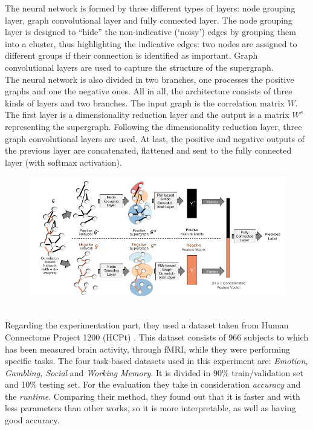The neural network is formed by three different types of layers: node grouping layer, graph convolutional layer and fully connected layer. The node grouping layer is designed to “hide” the non-indicative (‘noisy’) edges by grouping them into a cluster, thus highlighting the indicative edges: two nodes are assigned to different groups if their connection is identified as important.
Graph convolutional layers are used to capture the structure of the supergraph.
\\

The neural network is also divided in two branches, one processes the positive graphs and one the negative ones. 
All in all, the architecture consists of three kinds of layers and two branches. 
The input graph is the correlation matrix $W$. The first layer is a dimensionality reduction layer and the output is a matrix $W^{s}$ representing the supergraph. Following the dimensionality reduction layer, three graph convolutional layers are used. At last, the positive and negative outputs of the previous layer are concatenated, flattened and sent to the fully connected layer (with softmax activation).
\begin{figure}[htbp]
	\centering
	\includegraphics[scale=0.8]{Immagini/Groupinn1.PNG}
	\caption{\label{fig:diagram5}}
\end{figure}
\\

Regarding the experimentation part, they used a dataset taken from Human Connectome Project 1200 (HCPt) \cite{hcp}. 
This dataset consists of 966 subjects to which has been measured brain activity, through fMRI, while they were performing specific tasks. The four task-based datasets used in this experiment are: \textit{Emotion, Gambling, Social} and \textit{Working Memory}. It is divided in 90\% train/validation set and 10\% testing set. For the evaluation they take in consideration \textit{accuracy} and the \textit{runtime}. Comparing their method, they found out that it is faster and with less parameters than other works, so it is more interpretable, as well as having good accuracy.
\\

